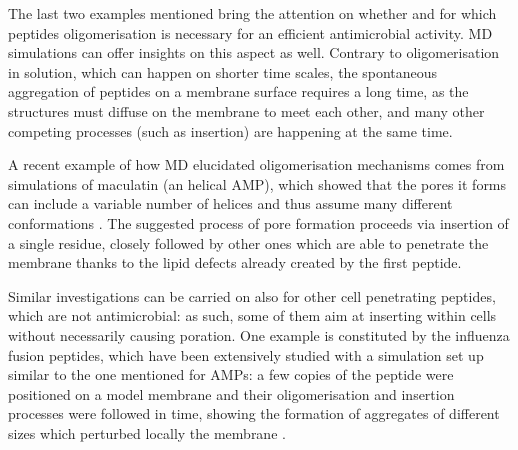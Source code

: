The last two examples mentioned bring the attention on whether and for which peptides oligomerisation is necessary for an efficient antimicrobial activity. MD simulations can offer insights on this aspect as well. Contrary to oligomerisation in solution, which can happen on shorter time scales, the spontaneous aggregation of peptides on a membrane surface requires a long time, as the structures must diffuse on the membrane to meet each other, and many other competing processes (such as insertion) are happening at the same time.

A recent example of how MD elucidated oligomerisation mechanisms comes from simulations of maculatin (an helical AMP), which showed that the pores it forms can include a variable number of helices and thus assume many different conformations \citep{Wang2016}. The suggested process of pore formation proceeds via insertion of a single residue, closely followed by other ones which are able to penetrate the membrane thanks to the lipid defects already created by the first peptide.

Similar investigations can be carried on also for other cell penetrating peptides, which are not antimicrobial: as such, some of them aim at inserting within cells without necessarily causing poration. One example is constituted by the influenza fusion peptides, which have been extensively studied with a simulation set up similar to the one mentioned for AMPs: a few copies of the peptide were positioned on a model membrane and their oligomerisation and insertion processes were followed in time, showing the formation of aggregates of different sizes which perturbed locally the membrane \citep{Haria2014,Collu2015}.

